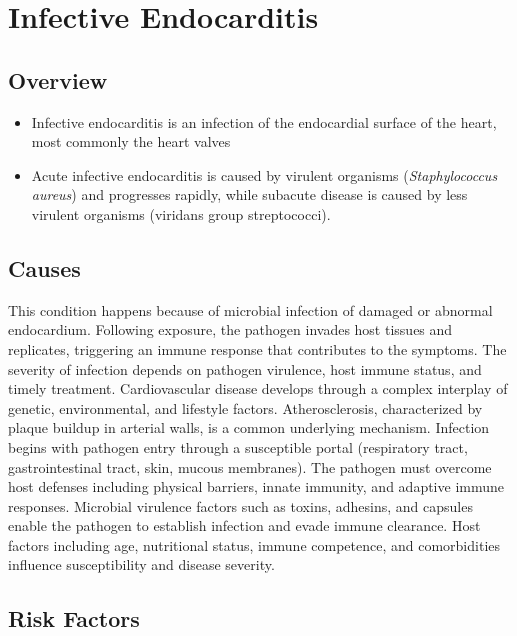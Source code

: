 \chapter{Infective Endocarditis}
\label{sec:Infective Endocarditis}

\section{Overview}


\begin{itemize}[noitemsep]
  \item Infective endocarditis is an infection of the endocardial surface of the heart, most commonly the heart valves
  \item Acute infective endocarditis is caused by virulent organisms (\textit{Staphylococcus aureus}) and progresses rapidly, while subacute disease is caused by less virulent organisms (viridans group streptococci).
\end{itemize}
\section{Causes}
This condition happens because of microbial infection of damaged or abnormal endocardium. Following exposure, the pathogen invades host tissues and replicates, triggering an immune response that contributes to the symptoms. The severity of infection depends on pathogen virulence, host immune status, and timely treatment. Cardiovascular disease develops through a complex interplay of genetic, environmental, and lifestyle factors. Atherosclerosis, characterized by plaque buildup in arterial walls, is a common underlying mechanism. Infection begins with pathogen entry through a susceptible portal (respiratory tract, gastrointestinal tract, skin, mucous membranes). The pathogen must overcome host defenses including physical barriers, innate immunity, and adaptive immune responses. Microbial virulence factors such as toxins, adhesins, and capsules enable the pathogen to establish infection and evade immune clearance. Host factors including age, nutritional status, immune competence, and comorbidities influence susceptibility and disease severity.   
\section{Risk Factors}

